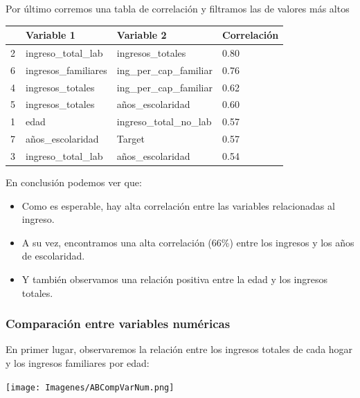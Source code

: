 \documentclass[a4paper]{article}
\begin{document}
        Por último corremos una tabla de correlación y filtramos las de valores más altos
 
        \begin{table}[H]
            \centering
            \begin{tabular}{|l|l|l|l|}
            \hline
                ~ & Variable 1 & Variable 2 & Correlación \\ \hline
                2 & ingreso\_total\_lab & ingresos\_totales & 0.80 \\ \hline
                6 & ingresos\_familiares & ing\_per\_cap\_familiar & 0.76 \\ \hline
                4 & ingresos\_totales & ing\_per\_cap\_familiar & 0.62 \\ \hline
                5 & ingresos\_totales & años\_escolaridad & 0.60 \\ \hline
                1 & edad & ingreso\_total\_no\_lab & 0.57 \\ \hline
                7 & años\_escolaridad & Target & 0.57 \\ \hline
                3 & ingreso\_total\_lab & años\_escolaridad & 0.54 \\ \hline
            \end{tabular}
        \end{table}
 
        En conclusión podemos ver que:
        \begin{itemize}
            \item Como es esperable, hay alta correlación entre las variables relacionadas al ingreso.
            \item A su vez, encontramos una alta correlación (66\%) entre los ingresos y los años de escolaridad.
            \item Y también observamos una relación positiva entre la edad y los ingresos totales.
        \end{itemize}
 
        \subsubsection{Comparación entre variables numéricas}
 
            En primer lugar, observaremos la relación entre los ingresos totales de cada hogar y los ingresos familiares por edad:
            \begin{center}
                \texttt{[image: Imagenes/ABCompVarNum.png]}
            \end{center}
 
\end{document}
